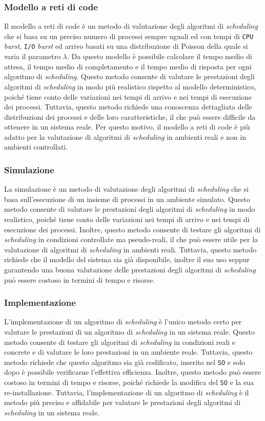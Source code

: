             \subsubsection{Modello a reti di code} 
                Il modello a reti di code è un metodo di valutazione degli algoritmi di \textit{scheduling} che si basa su un preciso numero di processi sempre uguali ed con tempi di \texttt{CPU} \textit{burst}, \texttt{I/O} \textit{burst} ed arrivo basati su una distribuzione di Poisson della quale si varia il parametro $\lambda$. Da questo modello è possibile calcolare il tempo medio di attesa, il tempo medio di completamento e il tempo medio di risposta per ogni algoritmo di \textit{scheduling}. Questo metodo consente di valutare le prestazioni degli algoritmi di \textit{scheduling} in modo più realistico rispetto al modello deterministico, poiché tiene conto delle variazioni nei tempi di arrivo e nei tempi di esecuzione dei processi. Tuttavia, questo metodo richiede una conoscenza dettagliata delle distribuzioni dei processi e delle loro caratteristiche, il che può essere difficile da ottenere in un sistema reale. Per questo motivo, il modello a reti di code è più adatto per la valutazione di algoritmi di \textit{scheduling} in ambienti reali e non in ambienti controllati.
            \subsubsection{Simulazione}
                La simulazione è un metodo di valutazione degli algoritmi di \textit{scheduling} che si basa sull'esecuzione di un insieme di processi in un ambiente simulato. Questo metodo consente di valutare le prestazioni degli algoritmi di \textit{scheduling} in modo realistico, poiché tiene conto delle variazioni nei tempi di arrivo e nei tempi di esecuzione dei processi. Inoltre, questo metodo consente di testare gli algoritmi di \textit{scheduling} in condizioni controllate ma pseudo-reali, il che può essere utile per la valutazione di algoritmi di \textit{scheduling} in ambienti reali. Tuttavia, questo metodo richiede che il modello del sistema sia già disponibile, inoltre il suo uso seppur garantendo una buona valutazione delle prestazioni degli algoritmi di \textit{scheduling} può essere costoso in termini di tempo e risorse.
            \subsubsection{Implementazione}
                L'implementazione di un algoritmo di \textit{scheduling} è l'unico metodo certo per valutare le prestazioni di un algoritmo di \textit{scheduling} in un sistema reale. Questo metodo consente di testare gli algoritmi di \textit{scheduling} in condizioni reali e concrete e di valutare le loro prestazioni in un ambiente reale. Tuttavia, questo metodo richiede che questo algoritmo sia già codificato, inserito nel \texttt{SO} e solo dopo è possibile verificarne l'effettiva efficienza. Inoltre, questo metodo può essere costoso in termini di tempo e risorse, poiché richiede la modifica del \texttt{SO} e la sua re-installazione. Tuttavia, l'implementazione di un algoritmo di \textit{scheduling} è il metodo più preciso e affidabile per valutare le prestazioni degli algoritmi di \textit{scheduling} in un sistema reale.
